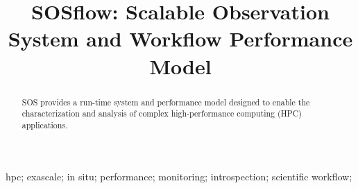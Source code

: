 
\title{SOSflow: Scalable Observation System and Workflow Performance Model}

\author{
\IEEEauthorblockA{Department of Computer and Information Science\\
                  University of Oregon\\ Eugene, OR United States\\
                  Email: cdw@cs.uoregon.edu} }
\maketitle


\begin{abstract}
SOS provides a run-time system and performance model designed to
enable the characterization and analysis of complex high-performance
computing (HPC) applications.
\end{abstract}


\begin{IEEEkeywords}
hpc; exascale; in situ; performance; monitoring; introspection;
scientific workflow;
\end{IEEEkeywords}


\IEEEpeerreviewmaketitle


